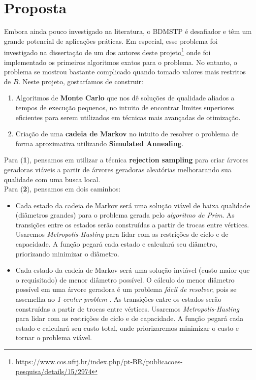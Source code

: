 \documentclass[12pt]{article}
\begin{document}
\section{Proposta}

Embora ainda pouco investigado na literatura, o BDMSTP é desafiador e têm um grande potencial de aplicações práticas. Em especial, esse problema foi investigado na dissertação de um dos autores deste projeto\footnote{\url{https://www.cos.ufrj.br/index.php/pt-BR/publicacoes-pesquisa/details/15/2974}} onde foi implementado os primeiros algoritmos exatos para o problema. No entanto, o problema se mostrou bastante complicado quando tomado valores mais restritos de $B$. Neste projeto, gostaríamos de construir:

\begin{enumerate}
	\item Algoritmos de \textbf{Monte Carlo} que nos dê soluções de qualidade aliados a tempos de execução pequenos, no intuito de encontrar limites superiores eficientes para serem utilizados em técnicas mais avançadas de otimização. 
	\item Criação de uma \textbf{cadeia de Markov} no intuito de resolver o problema de forma aproximativa utilizando \textbf{Simulated Annealing}.
\end{enumerate}

Para (\textbf{1}), pensamos em utilizar a técnica \textbf{rejection sampling} para criar árvores geradoras viáveis a partir de árvores geradoras aleatórias melhorarando sua qualidade com uma busca local.\\

Para (\textbf{2}), pensamos em dois caminhos:
\begin{itemize}
	\item Cada estado da cadeia de Markov será uma solução viável de baixa qualidade (diâmetros grandes) para o problema gerada pelo \textit{algoritmo de Prim}. As transições entre os estados serão construídas a partir de trocas entre vértices. Usaremos \textit{Metropolis-Hasting} para lidar com as restrições de ciclo e de capacidade. A função pegará cada estado e calculará seu diâmetro, priorizando minimizar o diâmetro. 
	\item Cada estado da cadeia de Markov será uma solução inviável (custo maior que o requisitado) de menor diâmetro possível. O cálculo do menor diâmetro possível em uma árvore geradora é um problema \textit{fácil de resolver}, pois se assemelha ao \textit{1-center problem} \cite{Hassin1995}. As transições entre os estados serão construídas a partir de trocas entre vértices. Usaremos \textit{Metropolis-Hasting} para lidar com as restrições de ciclo e de capacidade. A função pegará cada estado e calculará seu custo total, onde priorizaremos minimizar o custo e tornar o problema viável.
\end{itemize}  
\end{document}
